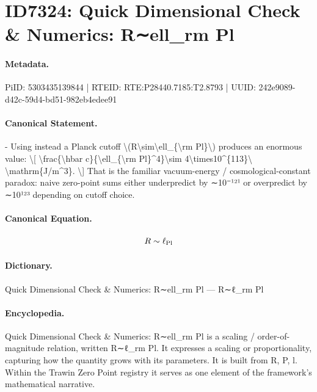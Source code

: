 \section*{ID7324: Quick Dimensional Check \& Numerics: R∼ell\_rm Pl}
\paragraph{Metadata.}
PiID: 5303435139844 | RTEID: RTE:P28440.7185:T2.8793 | UUID: 242e9089-d42c-59d4-bd51-982eb4edee91

\paragraph{Canonical Statement.}
- Using instead a Planck cutoff \textbackslash{}(R\textbackslash{}sim\textbackslash{}ell\_\{\textbackslash{}rm Pl\}\textbackslash{}) produces an enormous value: \textbackslash{}[ \textbackslash{}frac\{\textbackslash{}hbar c\}\{\textbackslash{}ell\_\{\textbackslash{}rm Pl\}\textasciicircum{}4\}\textbackslash{}sim 4\textbackslash{}times10\textasciicircum{}\{113\}\textbackslash{} \textbackslash{}mathrm\{J/m\textasciicircum{}3\}. \textbackslash{}] That is the familiar vacuum-energy / cosmological-constant paradox: naive zero-point sums either underpredict by ∼10⁻¹²¹ or overpredict by ∼10¹²³ depending on cutoff choice.

\paragraph{Canonical Equation.}
\[
R\sim\ell_{\rm Pl}
\]

\paragraph{Dictionary.}
Quick Dimensional Check \& Numerics: R∼ell\_rm Pl — R∼ℓ\_rm Pl

\paragraph{Encyclopedia.}
Quick Dimensional Check \& Numerics: R∼ell\_rm Pl is a scaling / order-of-magnitude relation, written R∼ℓ\_rm Pl. It expresses a scaling or proportionality, capturing how the quantity grows with its parameters. It is built from R, P, l. Within the Trawin Zero Point registry it serves as one element of the framework's mathematical narrative.
